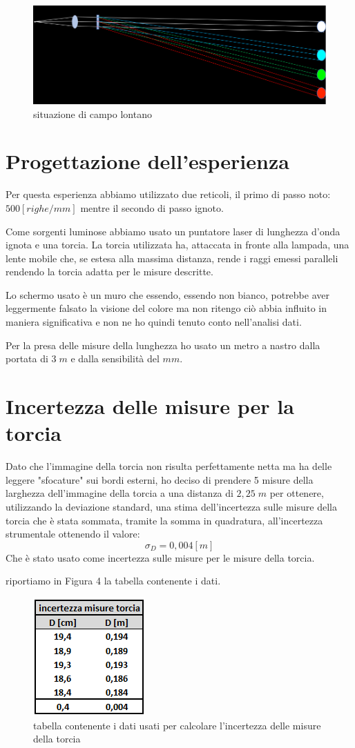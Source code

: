 \documentclass{article}
\begin{document}
\begin{figure}[h!]
  \centering
  \includegraphics[width=0.4\linewidth]{IM reticolo collimato lontano}
  \caption{situazione di campo lontano}
\end{figure}


\pagebreak
\section{Progettazione dell'esperienza}
Per questa esperienza abbiamo utilizzato due reticoli, il primo di passo noto: $500 [righe/mm]$ mentre il secondo di passo ignoto. 

Come sorgenti luminose abbiamo usato un puntatore laser di lunghezza d'onda ignota e una torcia. La torcia utilizzata ha, attaccata in fronte alla lampada, una lente mobile che, se estesa alla massima distanza, rende i raggi emessi paralleli rendendo la torcia adatta per le misure descritte.

Lo schermo usato è un muro che essendo, essendo non bianco, potrebbe aver leggermente falsato la visione del colore ma non ritengo ciò abbia influito in maniera significativa e non ne ho quindi  tenuto conto nell'analisi dati.

Per la presa delle misure della lunghezza ho usato un metro a nastro dalla portata di $3 \; m$ e dalla sensibilità del $mm$.

\section{Incertezza delle misure per la torcia}
Dato che l'immagine della torcia non risulta perfettamente netta ma ha delle leggere "sfocature" sui bordi esterni, ho deciso di prendere 5 misure della larghezza dell'immagine della torcia a una distanza di $2,25 \; m$ per ottenere, utilizzando la deviazione standard, una stima dell'incertezza sulle misure della torcia che è stata sommata, tramite la somma in quadratura, all'incertezza strumentale ottenendo il valore:
\[ \sigma_D = 0,004 [m]\]
Che è stato usato come incertezza sulle misure per le misure della torcia.

riportiamo in Figura 4 la tabella contenente i dati.

\begin{figure}[h!]
  \centering
  \includegraphics[width=0.25\linewidth]{IM tabella incertezza torcia}
  \caption{tabella contenente i dati usati per calcolare l'incertezza delle misure della torcia}
\end{figure}
\end{document}
